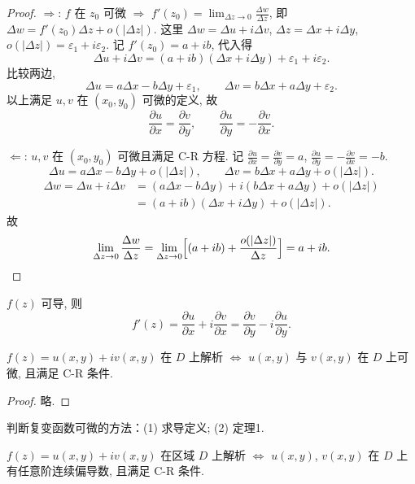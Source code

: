 \documentclass[theorem=false,mathfont=none,openany,sub3section]{easybook}
\begin{document}
\begin{proof}
  $\Rightarrow$: $f$ 在 $z_{0}$ 可微 $\Rightarrow$ $f'(z_{0})=\lim_{\Delta z\to0}\frac{\Delta w}{\Delta z}$,
  即 $\Delta w=f'(z_{0})\Delta z+o(|\Delta z|)$.
  这里 $\Delta w=\Delta u+i\Delta v$, $\Delta z=\Delta x+i\Delta y$, $o(|\Delta z|)=\varepsilon_{1}+i\varepsilon_{2}$.
  记 $f'(z_{0})=a+ib$, 代入得
  \[
  \Delta u+i\Delta v=(a+ib)(\Delta x+i\Delta y)+\varepsilon_{1}+i\varepsilon_{2}.
  \]
  比较两边,
  \[
  \Delta u=a\Delta x-b\Delta y+\varepsilon_{1},\qquad
  \Delta v=b\Delta x+a\Delta y+\varepsilon_{2}.
  \]
  以上满足 $u,v$ 在 $(x_{0},y_{0})$ 可微的定义, 故
  \[
  \frac{\partial u}{\partial x}=\frac{\partial v}{\partial y},\qquad
  \frac{\partial u}{\partial y}=-\frac{\partial v}{\partial x}.
  \]

  $\Leftarrow$: $u,v$ 在 $(x_{0},y_{0})$ 可微且满足 C-R 方程. 记
  $\frac{\partial u}{\partial x}=\frac{\partial v}{\partial y}=a$,
  $\frac{\partial u}{\partial y}=-\frac{\partial v}{\partial x}=-b$.
  \[
  \Delta u=a\Delta x-b\Delta y+o(|\Delta z|),\qquad
  \Delta v=b\Delta x+a\Delta y+o(|\Delta z|).
  \]
  \[
  \begin{aligned}
  \Delta w=\Delta u+i\Delta v
  &=(a\Delta x-b\Delta y)+i(b\Delta x+a\Delta y)+o(|\Delta z|)\\
  &=(a+ib)(\Delta x+i\Delta y)+o(|\Delta z|).
  \end{aligned}
  \]
  故
  \[
  \lim_{\Delta z\to0}\frac{\Delta w}{\Delta z}
  =\lim_{\Delta z\to0}\Bigl[(a+ib)+\frac{o(|\Delta z|)}{\Delta z}\Bigr]=a+ib.
  \]
\end{proof}

\begin{corollary}
  $f(z)$ 可导, 则
  \[
  f'(z)=\frac{\partial u}{\partial x}+i\frac{\partial v}{\partial x}
  =\frac{\partial v}{\partial y}-i\frac{\partial u}{\partial y}.
  \]
\end{corollary}

\begin{theorem}
  $f(z)=u(x,y)+iv(x,y)$ 在 $D$ 上解析 $\Leftrightarrow$ $u(x,y)$ 与 $v(x,y)$ 在 $D$ 上可微, 且满足 C-R 条件.
\end{theorem}

\begin{proof}
  略.
\end{proof}

\begin{remark}
  判断复变函数可微的方法：(1) 求导定义; (2) 定理1.
\end{remark}

\begin{theorem}[后证]
  $f(z)=u(x,y)+iv(x,y)$ 在区域 $D$ 上解析 $\Leftrightarrow$ $u(x,y)$, $v(x,y)$ 在 $D$ 上有任意阶连续偏导数, 且满足 C-R 条件.
\end{theorem}
\end{document}
